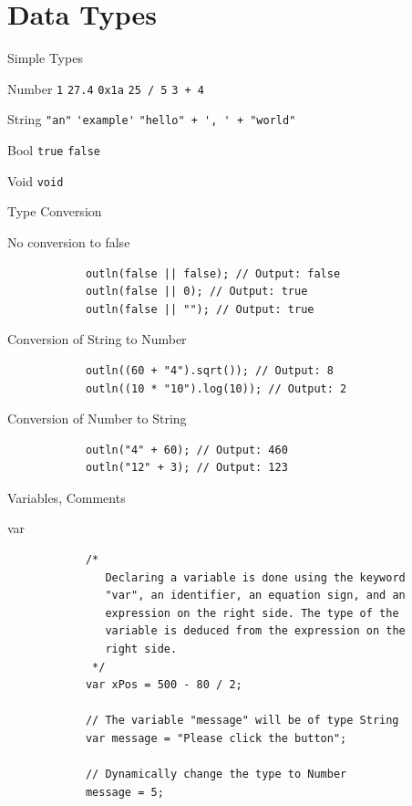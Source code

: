 \documentclass[ucs,9pt]{beamer}
\begin{document}
\section{Data Types}
\begin{frame}[fragile]{Simple Types}
	\begin{block}{Number}
		\hfill \lstinline!1! \hfill \lstinline!27.4! \hfill \lstinline!0x1a! \hfill \lstinline!25 / 5! \hfill \lstinline!3 + 4! \hfill{}
	\end{block}
	\begin{block}{String}
		\hfill \lstinline!"an"! \hfill \lstinline!'example'! \hfill \lstinline!"hello" + ', ' + "world"! \hfill{}
	\end{block}
	\begin{block}{Bool}
		\hfill \lstinline!true! \hfill \lstinline!false! \hfill{}
	\end{block}
	\begin{block}{Void}
		\hfill \lstinline!void! \hfill{}
	\end{block}
\end{frame}

\begin{frame}[fragile]{Type Conversion}
	\begin{block}{No conversion to false}
		\begin{lstlisting}
			outln(false || false); // Output: false
			outln(false || 0); // Output: true
			outln(false || ""); // Output: true
		\end{lstlisting}
	\end{block}
	\pause
	\begin{block}{Conversion of String to Number}
		\begin{lstlisting}
			outln((60 + "4").sqrt()); // Output: 8
			outln((10 * "10").log(10)); // Output: 2
		\end{lstlisting}
	\end{block}
	\pause
	\begin{block}{Conversion of Number to String}
		\begin{lstlisting}
			outln("4" + 60); // Output: 460
			outln("12" + 3); // Output: 123
		\end{lstlisting}
	\end{block}
\end{frame}

\begin{frame}[fragile]{Variables, Comments}
	\begin{block}{var}
		\begin{lstlisting}
			/*
			   Declaring a variable is done using the keyword
			   "var", an identifier, an equation sign, and an
			   expression on the right side. The type of the
			   variable is deduced from the expression on the
			   right side.
			 */
			var xPos = 500 - 80 / 2;

			// The variable "message" will be of type String
			var message = "Please click the button";

			// Dynamically change the type to Number
			message = 5;
		\end{lstlisting}
	\end{block}
\end{frame}
\end{document}

